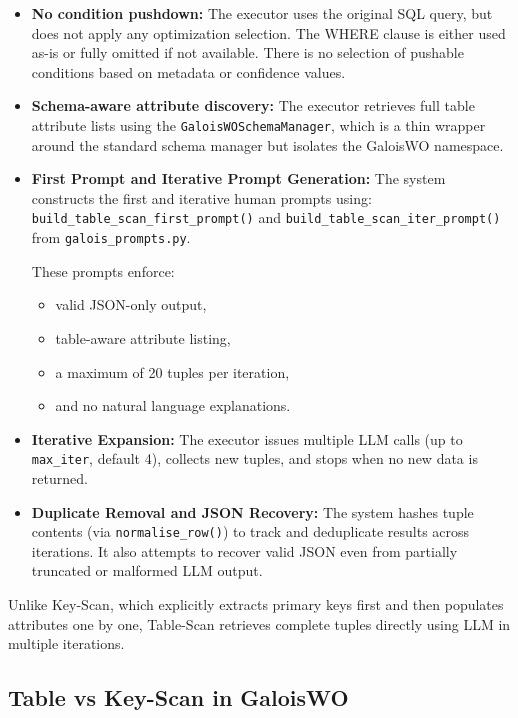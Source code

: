 \begin{itemize}
    \item \textbf{No condition pushdown:} The executor uses the original SQL query,
    but does not apply any optimization selection. The WHERE clause is either used
    as-is or fully omitted if not available. There is no selection of pushable
    conditions based on metadata or confidence values. 

    \item \textbf{Schema-aware attribute discovery:}
    The executor retrieves full table attribute lists using the
    \texttt{GaloisWOSchemaManager}, which is a thin wrapper around the
    standard schema manager but isolates the GaloisWO namespace. 

    \item \textbf{First Prompt and Iterative Prompt Generation:}
    The system constructs the first and iterative human prompts using:
    \texttt{build\_table\_scan\_first\_prompt()} and
    \texttt{build\_table\_scan\_iter\_prompt()} from \texttt{galois\_prompts.py}. 
    
    These prompts enforce:
    \begin{itemize}
        \item valid JSON-only output,
        \item table-aware attribute listing,
        \item a maximum of 20 tuples per iteration,
        \item and no natural language explanations.
    \end{itemize}

    \item \textbf{Iterative Expansion:}
    The executor issues multiple LLM calls (up to \texttt{max\_iter}, default 4),
    collects new tuples, and stops when no new data is returned. 

    \item \textbf{Duplicate Removal and JSON Recovery:}
    The system hashes tuple contents (via \texttt{normalise\_row()}) to track and
    deduplicate results across iterations. It also attempts to recover valid JSON
    even from partially truncated or malformed LLM output. 
\end{itemize}

Unlike Key-Scan, which explicitly extracts primary keys first and then populates
attributes one by one, Table-Scan retrieves complete tuples directly using LLM in
multiple iterations. 

\subsection{Table vs Key-Scan in GaloisWO}


